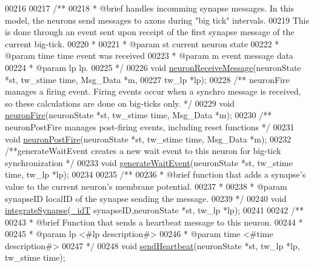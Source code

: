\begin{DoxyCode}
00216 
00217 \textcolor{comment}{/**}
00218 \textcolor{comment}{ *  @brief  handles incomming synapse messages. In this model, the neurons send messages to axons
       during "big tick" intervals.}
00219 \textcolor{comment}{ This is done through an event sent upon receipt of the first synapse message of the current big-tick.}
00220 \textcolor{comment}{ *}
00221 \textcolor{comment}{ *  @param st   current neuron state}
00222 \textcolor{comment}{ *  @param time time event was received}
00223 \textcolor{comment}{ *  @param m    event message data}
00224 \textcolor{comment}{ *  @param lp   lp.}
00225 \textcolor{comment}{ */}
00226 \textcolor{keywordtype}{void} \hyperlink{neuron_8h_aa6819d7492f0173f2234ba0b8b0bb674}{neuronReceiveMessage}(neuronState *st, tw\_stime time, Msg\_Data *m,
00227                           tw\_lp *lp);
00228 \textcolor{comment}{/** neuronFire manages a firing event. Firing events occur when a synchro message is received, so
       these calculations are done on big-ticks only. */}
00229 \textcolor{keywordtype}{void} \hyperlink{neuron_8h_ae071ef984b7e0dd4ec38fca91e0abe39}{neuronFire}(neuronState *st, tw\_stime time, Msg\_Data *m);
00230 \textcolor{comment}{/** neuronPostFire manages post-firing events, including reset functions */}
00231 \textcolor{keywordtype}{void} \hyperlink{neuron_8h_ab1f4997e4bfe11e78faa6d37748aee67}{neuronPostFire}(neuronState *st, tw\_stime time, Msg\_Data *m);
00232 \textcolor{comment}{/**generateWaitEvent creates a new wait event to this neuron for big-tick synchronization */}
00233 \textcolor{keywordtype}{void} \hyperlink{neuron_8h_a06ee765bfae45fe9b7f0619bf4abe63d}{generateWaitEvent}(neuronState *st, tw\_stime time, tw\_lp *lp);
00234 
00235 \textcolor{comment}{/**}
00236 \textcolor{comment}{ *  @brief  function that adds a synapse's value to the current neuron's membrane potential.}
00237 \textcolor{comment}{ *}
00238 \textcolor{comment}{ *  @param synapseID localID of the synapse sending the message.}
00239 \textcolor{comment}{ */}
00240 \textcolor{keywordtype}{void} \hyperlink{neuron_8h_ae630bdf5dd3744870968f07a6971659c}{integrateSynapse}(\hyperlink{assist_8h_a3f7a6e6a1210b6d9d7a42177dcb9634b}{\_idT} synapseID,neuronState *st, tw\_lp *lp);
00241 
00242 \textcolor{comment}{/**}
00243 \textcolor{comment}{ *  @brief  Function that sends a heartbeat message to this neuron.}
00244 \textcolor{comment}{ *}
00245 \textcolor{comment}{ *  @param lp   <#lp description#>}
00246 \textcolor{comment}{ *  @param time <#time description#>}
00247 \textcolor{comment}{ */}
00248 \textcolor{keywordtype}{void} \hyperlink{neuron_8h_a766dff9e530486b055e97ebe392268b8}{sendHeartbeat}(neuronState *st, tw\_lp *lp, tw\_stime time);

\end{DoxyCode}
